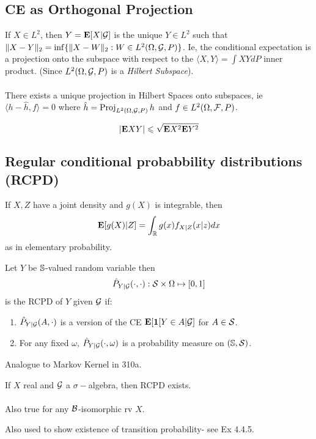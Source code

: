 \documentclass{article}
\newcommand{\Proj}{\operatorname{Proj}}
\begin{document}
\subsection{CE as Orthogonal Projection}
If $X\in L^2$, then $Y=\mathbf{E}[X|\mathcal G]$ is the unique $Y\in L^2$ such that $\|X-Y\|_2 = \inf\{\|X-W\|_2: W\in L^2(\Omega,\mathcal G,P)\}$. Ie, the conditional expectation is a projection onto the subspace with respect to the $\langle X, Y\rangle = \int XY dP$ inner product. (Since $L^2(\Omega,\mathcal G,P)$ is a \textit{Hilbert Subspace}). \\\\There exists a unique projection in Hilbert Spaces onto subspaces, ie $\langle h- \hat h, f\rangle = 0$ where $\hat h = \Proj_{L^2(\Omega,\calG,P)} h$ and $f\in L^2(\Omega,\mathcal F,P)$.
\begin{theorem}
$$|\mathbf{E} XY| \leqslant \sqrt{ \mathbf{E} X^2 \mathbf{E} Y^2}$$
\end{theorem}


\subsection{Regular conditional probabbility distributions (RCPD)}
\begin{theorem}
If $X,Z$ have a joint density and $g(X)$ is integrable, then
$$\mathbf{E}[g(X)|Z] = \int_\mathbb R g(x) f_{X|Z}(x|z)dx$$
as in elementary probability.
\end{theorem}

\begin{definition}
Let $Y$ be $\mathbb S$-valued random variable then $$\hat P_{Y|\mathcal G}(\cdot, \cdot): \mathcal S \times \Omega \mapsto [0,1]$$
is the RCPD of $Y$ given $\mathcal G$ if:
\begin{enumerate}
	\item $\hat P_{Y|\mathcal G}(A, \cdot)$ is a version of the CE $\mathbf{E} [\boldsymbol{1}[Y\in A |\cal G]$ for $A\in \mathcal S$.
	\item For any fixed $\omega$, $\hat P_{Y|\mathcal G}(\cdot, \omega)$ is a probability measure on $(\mathbb S,\mathcal S)$. 
\end{enumerate}
Analogue to Markov Kernel in 310a.
\end{definition}
\begin{theorem}
If $X$ real and $\mathcal G$ a $\sigma-$algebra, then RCPD exists. \\\\

Also true for any $\mathcal B$-isomorphic rv $X$. 
\end{theorem}
Also used to show existence of transition probability- see Ex 4.4.5.
\end{document}
